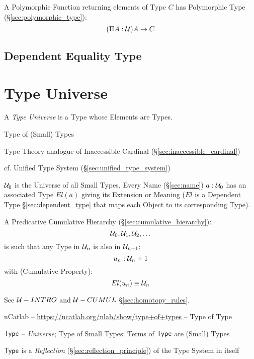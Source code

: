 A Polymorphic Function returning elements of Type $C$ has Polymorphic
Type (\S\ref{sec:polymorphic_type}):
\[
  (\Pi A:\mathcal{U}) A \rightarrow C
\]



\subsection{Dependent Equality Type}\label{sec:dependent_equality}



\section{Type Universe}\label{sec:type_universe}

A \emph{Type Universe} is a Type whose Elements are Types.

Type of (Small) Types

Type Theory analogue of Inaccessible Cardinal
(\S\ref{sec:inaccessible_cardinal})

\fist cf. Unified Type System (\S\ref{sec:unified_type_system})

$\mathcal{U}_0$ is the Universe of all Small Types. Every Name
(\S\ref{sec:name}) $a:\mathcal{U}_0$ has an associated Type $El(a)$
giving its Extension or Meaning ($El$ is a Dependent Type
\S\ref{sec:dependent_type} that maps each Object to its corresponding
Type).

A Predicative Cumulative Hierarchy (\S\ref{sec:cumulative_hierarchy}):
\[
  \mathcal{U}_0, \mathcal{U}_1, \mathcal{U}_2, \ldots
\]
is such that any Type in $\mathcal{U}_n$ is also in
$\mathcal{U}_{n+1}$:
\[
  u_n:\mathcal{U}_n+1
\]
with (Cumulative Property):
\[
  El(u_n) \equiv \mathcal{U}_n
\]

\fist See $\mathcal{U}-INTRO$ and $\mathcal{U}-CUMUL$
\S\ref{sec:homotopy_rules}.

\asterism

nCatlab -- \url{https://ncatlab.org/nlab/show/type+of+types} -- Type of
Type

$\mathsf{Type}$ -- \emph{Universe}; Type of Small Types: Terms of $\mathsf{Type}$ are
(Small) Types

$\mathsf{Type}$ is a \emph{Reflection} (\S\ref{sec:reflection_principle}) of
the Type System in itself


